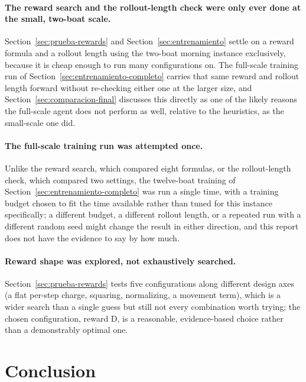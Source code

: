 \documentclass[11pt,a4paper]{article}
\begin{document}
\paragraph{The reward search and the rollout-length check were only ever done at the small, two-boat scale.} Section~\ref{sec:prueba-rewards} and Section~\ref{sec:entrenamiento} settle on a reward formula and a rollout length using the two-boat morning instance exclusively, because it is cheap enough to run many configurations on. The full-scale training run of Section~\ref{sec:entrenamiento-completo} carries that same reward and rollout length forward without re-checking either one at the larger size, and Section~\ref{sec:comparacion-final} discusses this directly as one of the likely reasons the full-scale agent does not perform as well, relative to the heuristics, as the small-scale one did.

\paragraph{The full-scale training run was attempted once.} Unlike the reward search, which compared eight formulas, or the rollout-length check, which compared two settings, the twelve-boat training of Section~\ref{sec:entrenamiento-completo} was run a single time, with a training budget chosen to fit the time available rather than tuned for this instance specifically; a different budget, a different rollout length, or a repeated run with a different random seed might change the result in either direction, and this report does not have the evidence to say by how much.

\paragraph{Reward shape was explored, not exhaustively searched.} Section~\ref{sec:prueba-rewards} tests five configurations along different design axes (a flat per-step charge, squaring, normalizing, a movement term), which is a wider search than a single guess but still not every combination worth trying; the chosen configuration, reward D, is a reasonable, evidence-based choice rather than a demonstrably optimal one.

\section{Conclusion}
\end{document}
